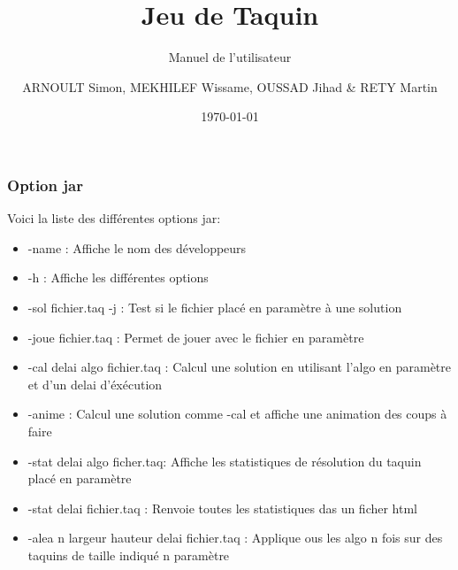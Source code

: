 \documentclass{beamer}
\title{Jeu de Taquin}
\subtitle{Manuel de l'utilisateur}
\author{ARNOULT Simon, MEKHILEF Wissame, OUSSAD Jihad \& RETY Martin}
\institute{Université d'Orléans}
\date{\today}
\begin{document}
  \begin{frame}
   \titlepage
  \end{frame}

  \begin{frame}
   \frametitle{Option jar}
	Voici la liste des différentes options jar:
	\begin{itemize}
	\item -name : Affiche le nom des développeurs
	\item -h : Affiche les différentes options
	\item -sol fichier.taq -j : Test si le fichier placé en paramètre à une solution
	\item -joue fichier.taq : Permet de jouer avec le fichier en paramètre
	\item -cal delai algo fichier.taq : Calcul une solution en utilisant l'algo en paramètre et d'un delai d'éxécution
	\item -anime : Calcul une solution comme -cal et affiche une animation des coups à faire
	\item -stat delai algo ficher.taq: Affiche les statistiques de résolution du taquin placé en paramètre
	\item -stat delai fichier.taq : Renvoie toutes les statistiques das un ficher html
	\item -alea n largeur hauteur delai fichier.taq : Applique ous les algo n fois sur des taquins de taille indiqué n paramètre
	\end{itemize}
   \end{frame}
   
\end{document}
